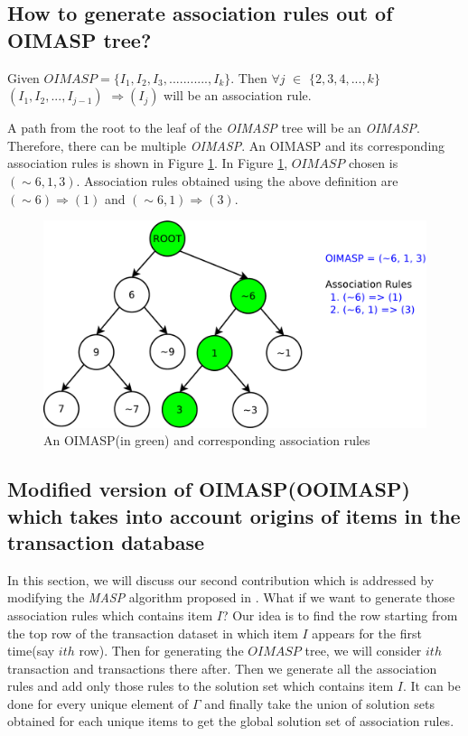 \documentclass[5p, twocolumn]{elsarticle}
\begin{document}
\subsection{How to generate association rules out of OIMASP tree?}
\begin{rmk}
	Given $ OIMASP = \{I_{1}, I_{2}, I_{3}, ..........., I_{k}\} $. Then $ \forall j $ $ \in $ $ \lbrace 2, 3, 4, 		..., k \rbrace $ $ (I_{1}, I_{2}, ..., I_{j-1})$ $ \Rightarrow (I_{j}) $ will be an association rule.		
\end{rmk}

A path from the root to the leaf of the \emph{OIMASP} tree will be an \emph{OIMASP}. Therefore, there can be multiple \emph{OIMASP}. An OIMASP and its corresponding association rules is shown in Figure \ref{Fig 7}. In Figure \ref{Fig 7}, $ OIMASP $ chosen is $ (\sim 6, 1, 3) $. Association rules obtained using the above definition are 
$ (\sim 6) \Rightarrow (1) $ and $ (\sim 6, 1) \Rightarrow (3) $.

\begin{figure}
\begin{center}
\includegraphics[scale=0.35]{pdf/oimasp}
\end{center}
\caption{An OIMASP(in green) and corresponding association rules}
\label{Fig 7}
\end{figure}

\subsection{Modified version of OIMASP(OOIMASP) which takes into account origins of items in the transaction database}
In this section, we will discuss our second contribution which is addressed by modifying the \emph{MASP} algorithm proposed in \cite{oldmasp}. What if we want to generate those association rules which contains item $ I $? Our idea is to find the row starting from the top row of the transaction dataset in which item $ I $ appears for the first time(say $ ith $ row). Then for generating the $ OIMASP $ tree, we will consider $ ith $ transaction and transactions there after. Then we generate all the association rules and add only those rules to the solution set which contains item $ I $. It can be done for every unique element of $ \Gamma $ and finally take the union of solution sets obtained for each unique items to get the global solution set of association rules.
\end{document}
